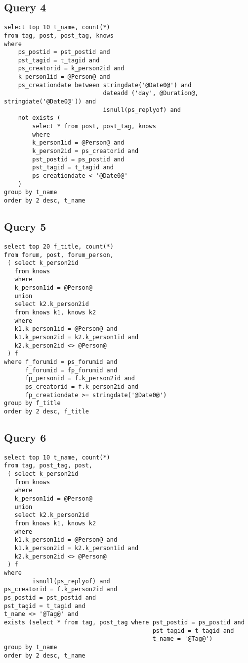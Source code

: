\subsection{Query 4}
\begin{verbatim}
select top 10 t_name, count(*)
from tag, post, post_tag, knows
where
    ps_postid = pst_postid and
    pst_tagid = t_tagid and
    ps_creatorid = k_person2id and
    k_person1id = @Person@ and
    ps_creationdate between stringdate('@Date0@') and 
                            dateadd ('day', @Duration@, stringdate('@Date0@')) and
                            isnull(ps_replyof) and
    not exists (
        select * from post, post_tag, knows
        where
        k_person1id = @Person@ and
        k_person2id = ps_creatorid and
        pst_postid = ps_postid and
        pst_tagid = t_tagid and
        ps_creationdate < '@Date0@'
    )
group by t_name
order by 2 desc, t_name
\end{verbatim}


\subsection{Query 5}
\begin{verbatim}
select top 20 f_title, count(*)
from forum, post, forum_person,
 ( select k_person2id
   from knows
   where
   k_person1id = @Person@
   union
   select k2.k_person2id
   from knows k1, knows k2
   where
   k1.k_person1id = @Person@ and 
   k1.k_person2id = k2.k_person1id and
   k2.k_person2id <> @Person@
 ) f
where f_forumid = ps_forumid and 
      f_forumid = fp_forumid and 
      fp_personid = f.k_person2id and 
      ps_creatorid = f.k_person2id and
      fp_creationdate >= stringdate('@Date0@')
group by f_title
order by 2 desc, f_title
\end{verbatim}

\subsection{Query 6}
\begin{verbatim}
select top 10 t_name, count(*)
from tag, post_tag, post,
 ( select k_person2id
   from knows
   where
   k_person1id = @Person@
   union
   select k2.k_person2id
   from knows k1, knows k2
   where
   k1.k_person1id = @Person@ and 
   k1.k_person2id = k2.k_person1id and 
   k2.k_person2id <> @Person@
 ) f
where
        isnull(ps_replyof) and
ps_creatorid = f.k_person2id and
ps_postid = pst_postid and
pst_tagid = t_tagid and
t_name <> '@Tag@' and
exists (select * from tag, post_tag where pst_postid = ps_postid and 
                                          pst_tagid = t_tagid and 
                                          t_name = '@Tag@')
group by t_name
order by 2 desc, t_name
\end{verbatim}


